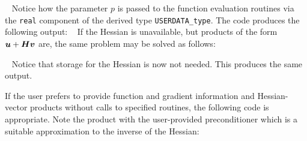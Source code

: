 \documentclass{galahad}
\begin{document}
{\tt \small
\VerbatimInput{\packageexample}
}
\noindent
Notice how the parameter $p$ is passed to the function evaluation
routines via the {\tt real} component of the derived type {\tt USERDATA\_type}.
The code produces the following output:
{\tt \small
\VerbatimInput{\packageresults}
}
\noindent
If the Hessian is unavailable, but products of the form
${\bm{u}} + {\bm{H}} {\bm{v}}$ are, the same problem may be solved as follows:

{\tt \small
\VerbatimInput{\packageexampleb}
}
\noindent
Notice that storage for the Hessian is now not needed.
This produces the same output.

If the user prefers to provide function and gradient information and
Hessian-vector products
without calls to specified routines, the following code is appropriate.
Note the product with the user-provided preconditioner
which is a suitable approximation to the inverse of the Hessian:

{\tt \small
\VerbatimInput{\packageexamplec}
}
\noindent
\noindent
\end{document}
